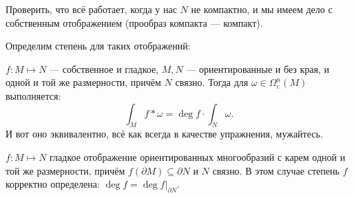 Проверить, что всё работает, когда у нас $N$ не компактно, и мы имеем дело с собственным отображением (прообраз компакта --- компакт).

Определим степень для таких отображений:
\begin{to_def}
	$f \colon M \mapsto N$ --- собственное и гладкое, $M,N$ --- ориентированные и без края, и одной и той же размерности, причём $N$ связно. Тогда для $\omega \in \Omega_c^n (M)$ выполняется:
\begin{equation*}
	\int_{M} f* \omega = \deg f \cdot \int_{N} \omega.
\end{equation*}	
И вот оно эквивалентно, всё как всегда в качестве упражнения, мужайтесь.
\end{to_def}

\begin{to_lem}
	$f \colon M\mapsto N$ гладкое отображение ориентированных многообразий с карем одной и той же размерности, причём $f(\partial M) \subseteq \partial N$ и $N$ связно. В этом случае степень $f$ корректно определена: $\deg f = \deg f |_{\partial N} $.
\end{to_lem}